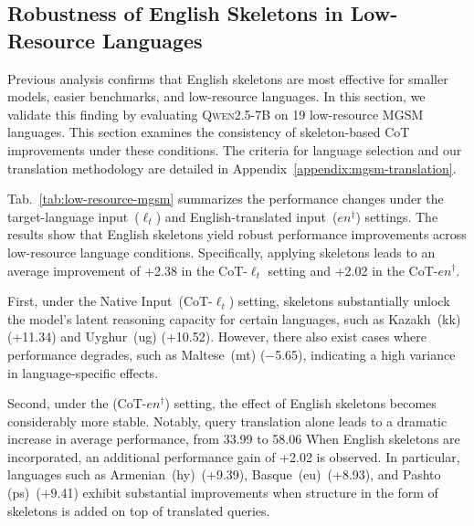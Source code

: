 \subsection{Robustness of English Skeletons in Low-Resource Languages}

Previous analysis confirms that English skeletons are most effective for smaller models, easier benchmarks, and low-resource languages. In this section, we validate this finding by evaluating \textsc{Qwen2.5-7B} on 19 low-resource MGSM languages. This section examines the consistency of skeleton-based CoT improvements under these conditions. The criteria for language selection and our translation methodology are detailed in Appendix~\ref{appendix:mgsm-translation}.


Tab.~\ref{tab:low-resource-mgsm} summarizes the performance changes under the target-language input~($\ell_t$) and English-translated input~($en^{\dagger}$) settings. The results show that English skeletons yield robust performance improvements across low-resource language conditions. Specifically, applying skeletons leads to an average improvement of +2.38 in the CoT-$\ell_t$ setting and +2.02 in the CoT-$en^{\dagger}$.

First, under the Native Input~(CoT-$\ell_t$) setting, skeletons substantially unlock the model’s latent reasoning capacity for certain languages, such as Kazakh~(kk) (+11.34) and Uyghur~(ug) (+10.52). However, there also exist cases where performance degrades, such as Maltese~(mt) (−5.65), indicating a high variance in language-specific effects.

Second, under the (CoT-$en^{\dagger}$) setting, the effect of English skeletons becomes considerably more stable. Notably, query translation alone leads to a dramatic increase in average performance, from 33.99 to 58.06
When English skeletons are incorporated, an additional performance gain of +2.02 is observed. In particular, languages such as Armenian~(hy)~(+9.39), Basque~(eu)~(+8.93), and Pashto (ps)~(+9.41) exhibit substantial improvements when structure in the form of skeletons is added on top of translated queries.

